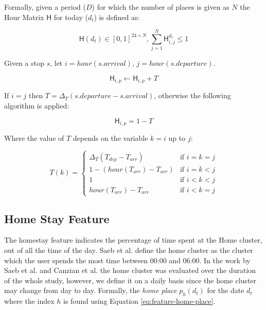Formally, given a period ($D$) for which the number of places is given as $N$ the Hour Matrix $\mathsf{H}$ for today ($d_t$) is defined as:

\begin{equation}
\label{eq:feature-hour-matrix-def}
\mathsf{H}(d_t) \in [0,1]^{24 \times N}, \sum_{j=1}^N \mathsf{H}^{d_t}_{i,j} \leq 1
\end{equation}

Given a stop $s$, let $i = hour(s.arrival)$, $j = hour(s.departure)$.

\begin{equation}
\label{eq:feature-hour-matrix-computation}
\mathsf{H}_{i,p} \leftarrow \mathsf{H}_{i,p} + T
\end{equation}

If $i = j$ then $T = \Delta_T (s.departure - s.arrival)$, otherwise the following algorithm is applied:

\begin{equation}
\label{eq:feature-hour-computaion2}
\mathsf{H}_{i,p} = 1 - T
\end{equation}

Where the value of $T$ depends on the variable $k = i$ up to $j$:

\begin{equation}
\label{eq:feature-hour-computaion3}
T(k) =
\begin{cases}
    \Delta_T (T_{dep} - T_{arr})    & \text{if $i = k = j$} \\
    1 - (hour(T_{arr}) - T_{arr})   & \text{if $i = k < j$} \\
    1                               & \text{if $i < k < j$} \\
    hour(T_{arr}) - T_{arr}         & \text{if $i < k = j$}
\end{cases}
\end{equation}


\subsection{Home Stay Feature}
The homestay feature indicates the percentage of time spent at the Home cluster, out of all the time of the day. Saeb et al. define the home cluster as the cluster which the user spends the most time between 00:00 and 06:00. In the work by Saeb et al. and Canzian et al. \cite{Saeb2015, saeb2016, Canzian2015} the home cluster was evaluated over the duration of the whole study, however, we define it on a daily basis since the home cluster may change from day to day. Formally, the \textit{home place} $p_h (d_t)$ for the date $d_t$ where the index $h$ is found using Equation \eqref{eq:feature-home-place}.

